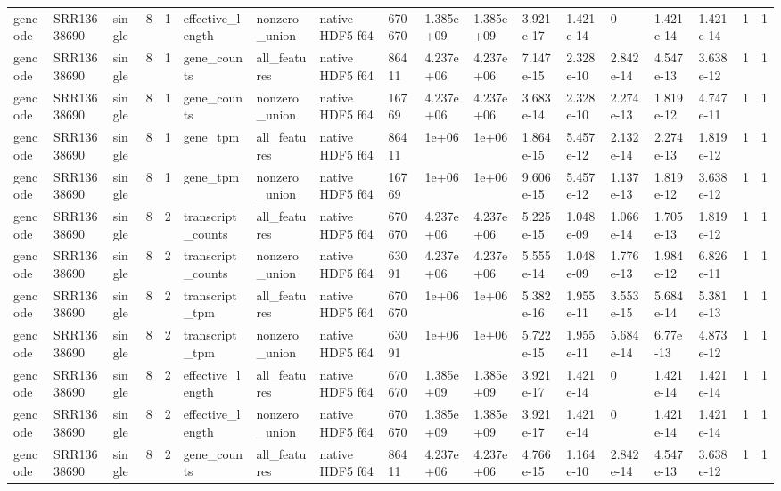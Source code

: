 \begin{tabular}{llllllllllllllllll}
gencode & SRR13638690 & single & 8 & 1 & effective\_length & nonzero\_union & native HDF5 f64 & 670670 & 1.385e+09 & 1.385e+09 & 3.921e-17 & 1.421e-14 & 0 & 1.421e-14 & 1.421e-14 & 1 & 1 \\
gencode & SRR13638690 & single & 8 & 1 & gene\_counts & all\_features & native HDF5 f64 & 86411 & 4.237e+06 & 4.237e+06 & 7.147e-15 & 2.328e-10 & 2.842e-14 & 4.547e-13 & 3.638e-12 & 1 & 1 \\
gencode & SRR13638690 & single & 8 & 1 & gene\_counts & nonzero\_union & native HDF5 f64 & 16769 & 4.237e+06 & 4.237e+06 & 3.683e-14 & 2.328e-10 & 2.274e-13 & 1.819e-12 & 4.747e-11 & 1 & 1 \\
gencode & SRR13638690 & single & 8 & 1 & gene\_tpm & all\_features & native HDF5 f64 & 86411 & 1e+06 & 1e+06 & 1.864e-15 & 5.457e-12 & 2.132e-14 & 2.274e-13 & 1.819e-12 & 1 & 1 \\
gencode & SRR13638690 & single & 8 & 1 & gene\_tpm & nonzero\_union & native HDF5 f64 & 16769 & 1e+06 & 1e+06 & 9.606e-15 & 5.457e-12 & 1.137e-13 & 1.819e-12 & 3.638e-12 & 1 & 1 \\
gencode & SRR13638690 & single & 8 & 2 & transcript\_counts & all\_features & native HDF5 f64 & 670670 & 4.237e+06 & 4.237e+06 & 5.225e-15 & 1.048e-09 & 1.066e-14 & 1.705e-13 & 1.819e-12 & 1 & 1 \\
gencode & SRR13638690 & single & 8 & 2 & transcript\_counts & nonzero\_union & native HDF5 f64 & 63091 & 4.237e+06 & 4.237e+06 & 5.555e-14 & 1.048e-09 & 1.776e-13 & 1.984e-12 & 6.826e-11 & 1 & 1 \\
gencode & SRR13638690 & single & 8 & 2 & transcript\_tpm & all\_features & native HDF5 f64 & 670670 & 1e+06 & 1e+06 & 5.382e-16 & 1.955e-11 & 3.553e-15 & 5.684e-14 & 5.381e-13 & 1 & 1 \\
gencode & SRR13638690 & single & 8 & 2 & transcript\_tpm & nonzero\_union & native HDF5 f64 & 63091 & 1e+06 & 1e+06 & 5.722e-15 & 1.955e-11 & 5.684e-14 & 6.77e-13 & 4.873e-12 & 1 & 1 \\
gencode & SRR13638690 & single & 8 & 2 & effective\_length & all\_features & native HDF5 f64 & 670670 & 1.385e+09 & 1.385e+09 & 3.921e-17 & 1.421e-14 & 0 & 1.421e-14 & 1.421e-14 & 1 & 1 \\
gencode & SRR13638690 & single & 8 & 2 & effective\_length & nonzero\_union & native HDF5 f64 & 670670 & 1.385e+09 & 1.385e+09 & 3.921e-17 & 1.421e-14 & 0 & 1.421e-14 & 1.421e-14 & 1 & 1 \\
gencode & SRR13638690 & single & 8 & 2 & gene\_counts & all\_features & native HDF5 f64 & 86411 & 4.237e+06 & 4.237e+06 & 4.766e-15 & 1.164e-10 & 2.842e-14 & 4.547e-13 & 3.638e-12 & 1 & 1 \\

\end{tabular}
